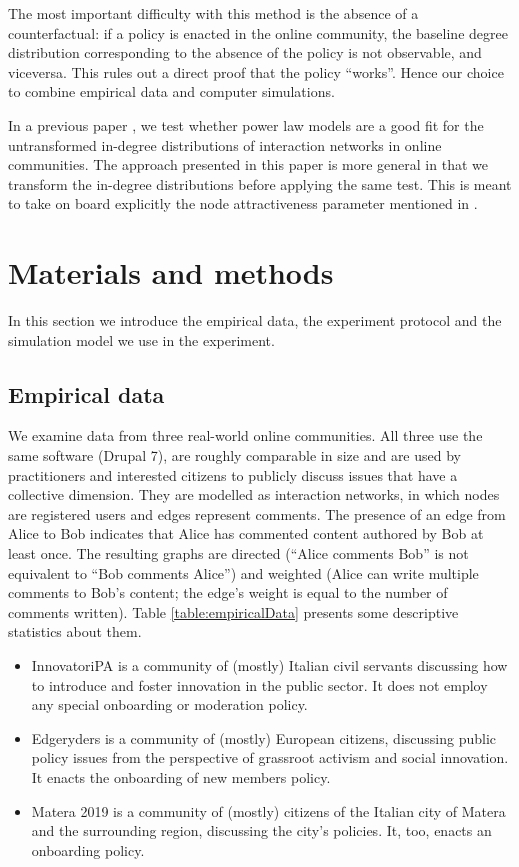 \documentclass{bmcart}
\begin{document}
The most important difficulty with this method is the absence of a counterfactual: if a policy is enacted in the online community, the baseline degree distribution corresponding to the absence of the policy is not observable, and viceversa. This rules out a direct proof that the policy ``works''. Hence our choice to combine empirical data and computer simulations. 

In a previous paper \cite{cottica2016testing}, we test whether power law models are a good fit for the untransformed in-degree distributions of interaction networks in online communities. The approach presented in this paper is more general in that we transform the in-degree distributions before applying the same test. This is meant to take on board explicitly the node attractiveness parameter mentioned in \cite{dorogovtsev2002evolution}.


\section*{Materials and methods}
\label{sec:materials}
In this section we introduce the empirical data, the experiment protocol and the simulation model we use in the experiment. 

\subsection*{Empirical data}
\label{sec:empirical_data}

We examine data from three real-world online communities. All three use the same software (Drupal 7), are roughly comparable in size and are used by practitioners and interested citizens to publicly discuss issues that have a collective dimension. They are modelled as interaction networks, in which nodes are registered users and edges represent comments. The presence of an edge from Alice to Bob indicates that Alice has commented content authored by Bob at least once. The resulting graphs are directed (``Alice comments Bob'' is not equivalent to ``Bob comments Alice'') and weighted (Alice can write multiple comments to Bob's content; the edge's weight is equal to the number of comments written). Table \ref{table:empiricalData} presents some descriptive statistics about them. 

\begin{itemize}
\item InnovatoriPA is a community of (mostly) Italian civil servants discussing how to introduce and foster innovation in the public sector. It does not employ any special onboarding or moderation policy. 
\item Edgeryders is a community of (mostly) European citizens, discussing public policy issues from the perspective of grassroot activism and social innovation. It enacts the onboarding of new members policy. 
\item Matera 2019 is a community of (mostly) citizens of the Italian city of Matera and the surrounding region, discussing the city's policies.
It, too, enacts an onboarding policy.
\end{itemize}
\end{document}
